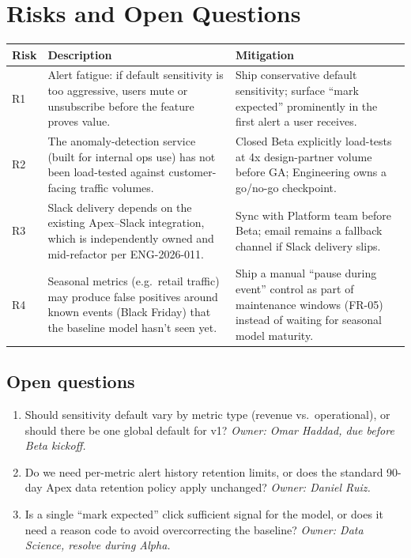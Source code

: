 \section{Risks and Open Questions}

\renewcommand{\arraystretch}{1.35}
\begin{tabularx}{\linewidth}{@{}p{1.2cm}Xp{3.3cm}@{}}
\toprule
\rowcolor{prdaccent}
{\color{white}Risk} & {\color{white}Description} & {\color{white}Mitigation} \\
\midrule
R1 & Alert fatigue: if default sensitivity is too aggressive, users mute or unsubscribe
  before the feature proves value. & Ship conservative default sensitivity; surface
  ``mark expected'' prominently in the first alert a user receives. \\
\addlinespace
R2 & The anomaly-detection service (built for internal ops use) has not been load-tested
  against customer-facing traffic volumes. & Closed Beta explicitly load-tests at 4x
  design-partner volume before GA; Engineering owns a go/no-go checkpoint. \\
\addlinespace
R3 & Slack delivery depends on the existing Apex--Slack integration, which is
  independently owned and mid-refactor per ENG-2026-011. & Sync with Platform team
  before Beta; email remains a fallback channel if Slack delivery slips. \\
\addlinespace
R4 & Seasonal metrics (e.g.\ retail traffic) may produce false positives around known
  events (Black Friday) that the baseline model hasn't seen yet. & Ship a manual
  ``pause during event'' control as part of maintenance windows (FR-05) instead of
  waiting for seasonal model maturity. \\
\bottomrule
\end{tabularx}

\subsection*{Open questions}
\begin{enumerate}[label=\textbf{Q\arabic*.}]
  \item Should sensitivity default vary by metric type (revenue vs.\ operational), or
    should there be one global default for v1? \emph{Owner: Omar Haddad, due before
    Beta kickoff.}
  \item Do we need per-metric alert history retention limits, or does the standard
    90-day Apex data retention policy apply unchanged? \emph{Owner: Daniel Ruiz.}
  \item Is a single ``mark expected'' click sufficient signal for the model, or does it
    need a reason code to avoid overcorrecting the baseline? \emph{Owner: Data Science,
    resolve during Alpha.}
\end{enumerate}
